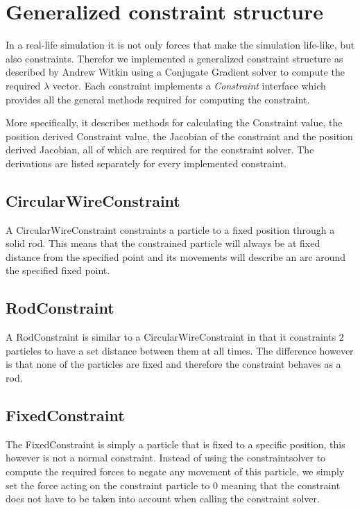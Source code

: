 \documentclass[a4paper,twoside,11pt,twocolumn]{article}
\begin{document}
\section{Generalized constraint structure}
In a real-life simulation it is not only forces that make the simulation life-like, but also constraints. Therefor we implemented a generalized constraint structure as described by Andrew Witkin\cite{url:pixar} using a Conjugate Gradient solver to compute the required $\lambda$ vector. Each constraint implements a \emph{Constraint} interface which provides all the general methods required for computing the constraint. 

More specifically, it describes methods for calculating the Constraint value, the position derived Constraint value, the Jacobian of the constraint and the position derived Jacobian, all of which are required for the constraint solver. The derivations are listed separately for every implemented constraint.

\subsection{CircularWireConstraint}
A CircularWireConstraint constraints a particle to a fixed position through a solid rod. This means that the constrained particle will always be at fixed distance from the specified point and its movements will describe an arc around the specified fixed point.

\subsection{RodConstraint}
A RodConstraint is similar to a CircularWireConstraint in that it constraints 2 particles to have a set distance between them at all times. The difference however is that none of the particles are fixed and therefore the constraint behaves as a rod.

\subsection{FixedConstraint}
The FixedConstraint is simply a particle that is fixed to a specific position, this however is not a normal constraint. Instead of using the constraintsolver to compute the required forces to negate any movement of this particle, we simply set the force acting on the constraint particle to 0 meaning that the constraint does not have to be taken into account when calling the constraint solver.
\end{document}

